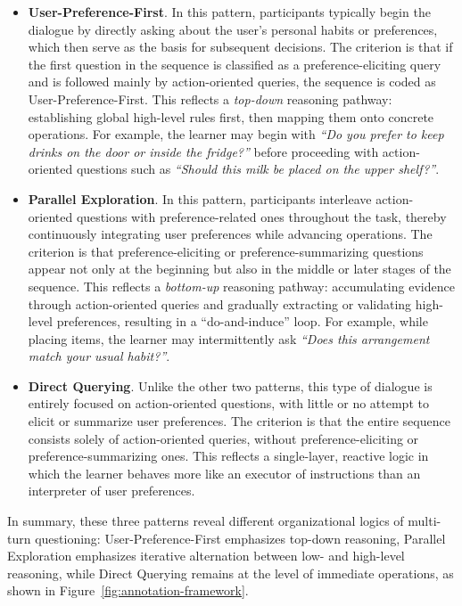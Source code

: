 \documentclass[sigconf,authordraft]{acmart}
\begin{document}
\begin{itemize}
    \item \textbf{User-Preference-First}. In this pattern, participants typically begin the dialogue by directly asking about the user’s personal habits or preferences, which then serve as the basis for subsequent decisions. The criterion is that if the first question in the sequence is classified as a preference-eliciting query and is followed mainly by action-oriented queries, the sequence is coded as User-Preference-First. This reflects a \textit{top-down} reasoning pathway: establishing global high-level rules first, then mapping them onto concrete operations. For example, the learner may begin with \textit{“Do you prefer to keep drinks on the door or inside the fridge?”} before proceeding with action-oriented questions such as \textit{“Should this milk be placed on the upper shelf?”}.
    
    \item \textbf{Parallel Exploration}. In this pattern, participants interleave action-oriented questions with preference-related ones throughout the task, thereby continuously integrating user preferences while advancing operations. The criterion is that preference-eliciting or preference-summarizing questions appear not only at the beginning but also in the middle or later stages of the sequence. This reflects a \textit{bottom-up} reasoning pathway: accumulating evidence through action-oriented queries and gradually extracting or validating high-level preferences, resulting in a “do-and-induce” loop. For example, while placing items, the learner may intermittently ask \textit{“Does this arrangement match your usual habit?”}.
    
    \item \textbf{Direct Querying}. Unlike the other two patterns, this type of dialogue is entirely focused on action-oriented questions, with little or no attempt to elicit or summarize user preferences. The criterion is that the entire sequence consists solely of action-oriented queries, without preference-eliciting or preference-summarizing ones. This reflects a single-layer, reactive logic in which the learner behaves more like an executor of instructions than an interpreter of user preferences.
\end{itemize}

In summary, these three patterns reveal different organizational logics of multi-turn questioning: User-Preference-First emphasizes top-down reasoning, Parallel Exploration emphasizes iterative alternation between low- and high-level reasoning, while Direct Querying remains at the level of immediate operations, as shown in 
Figure~\ref{fig:annotation-framework}.
\end{document}
